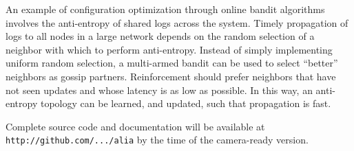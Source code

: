 \documentclass[letterpaper,10pt,twocolumn]{article}
\begin{document}

An example of configuration optimization through online bandit algorithms
\cite{bouneffouf_contextual_2014} involves the anti-entropy of shared logs across the system.
Timely propagation of logs to all nodes in a large network depends on the random
selection of a neighbor with which to perform anti-entropy.
Instead of simply implementing uniform random selection, a multi-armed bandit can be used
to select  ``better'' neighbors as gossip partners.
Reinforcement should prefer neighbors that have not seen updates and whose latency is as
low as possible.
In this way, an anti-entropy topology can be learned, and updated, such that propagation
is fast.

Complete source code and documentation will be available at \texttt{http://github.com/.../alia}
by the time of the camera-ready version.

\newpage
{\footnotesize 

}

\end{document}
